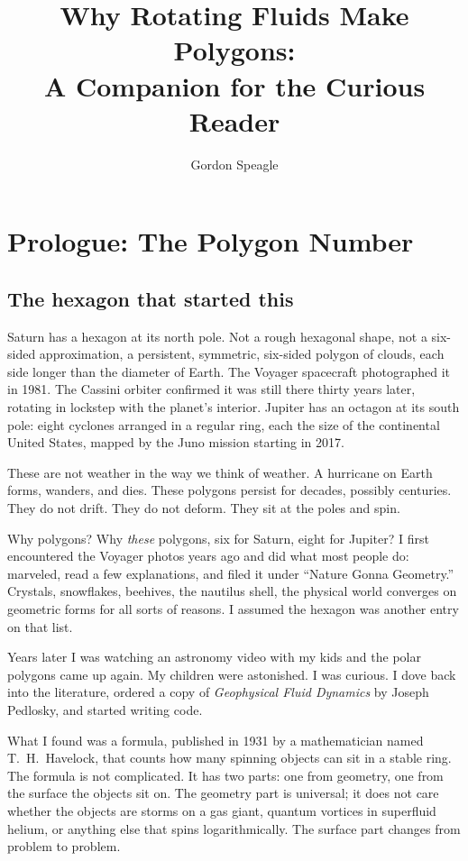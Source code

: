 

\title{Why Rotating Fluids Make Polygons:\\[6pt]
\large A Companion for the Curious Reader}
\author{Gordon Speagle}
\date{}


\maketitle

\section*{Prologue: The Polygon Number}

\subsection*{The hexagon that started this}

Saturn has a hexagon at its north pole. Not a rough hexagonal shape, not
a six-sided approximation, a persistent, symmetric, six-sided polygon
of clouds, each side longer than the diameter of Earth. The Voyager
spacecraft photographed it in 1981. The Cassini orbiter confirmed it
was still there thirty years later, rotating in lockstep with the
planet's interior. Jupiter has an octagon at its south pole: eight
cyclones arranged in a regular ring, each the size of the continental
United States, mapped by the Juno mission starting in 2017.

These are not weather in the way we think of weather. A hurricane on
Earth forms, wanders, and dies. These polygons persist for decades,
possibly centuries. They do not drift. They do not deform. They sit at
the poles and spin.

Why polygons? Why \emph{these} polygons, six for Saturn, eight for
Jupiter? I first encountered the Voyager photos years ago and did what
most people do: marveled, read a few explanations, and filed it under
``Nature Gonna Geometry.'' Crystals, snowflakes, beehives, the
nautilus shell, the physical world converges on geometric forms for
all sorts of reasons. I assumed the hexagon was another entry on that
list.

Years later I was watching an astronomy video with my kids and the
polar polygons came up again. My children were astonished. I was
curious. I dove back into the literature, ordered a copy of
\emph{Geophysical Fluid Dynamics} by Joseph Pedlosky, and started
writing code.

What I found was a formula, published in 1931 by a mathematician
named T.~H.~Havelock, that counts how many spinning objects can
sit in a stable ring. The formula is not complicated. It has two
parts: one from geometry, one from the surface the objects sit on.
The geometry part is universal; it does not care whether the objects
are storms on a gas giant, quantum vortices in superfluid helium, or
anything else that spins logarithmically. The surface part changes
from problem to problem.

